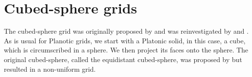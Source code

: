 \chapter{Cubed-sphere grids}
\label{chp-cs-grids}

The cubed-sphere grid was originally proposed by \citet{sadourny:1972} and was 
reinvestigated by \citet{ronchi:1996} and \citet{rancic:1996}. 
As is usual for Planotic grids, we start with a Platonic solid, in this case, a cube, 
which is circumscribed in a sphere. We then project its faces onto the sphere.
The original cubed-sphere, called the equidistant cubed-sphere, was proposed by 
\citet{sadourny:1972} but resulted in a non-uniform grid. 
